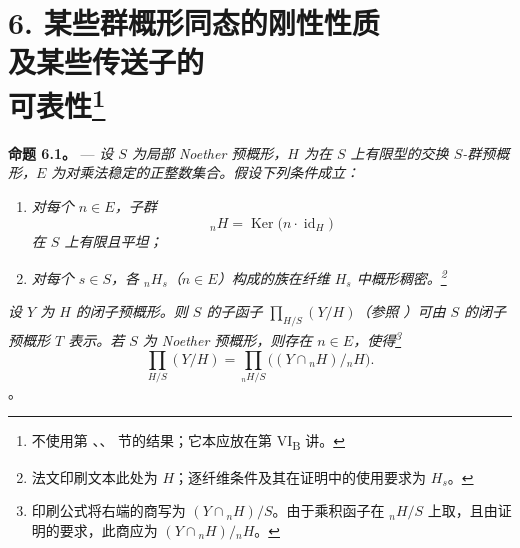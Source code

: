 
\section*{6. 某些群概形同态的刚性性质\\及某些传送子的\\可表性\footnote{ 不使用第 、、 节的结果；它本应放在第 VI\textsubscript{B} 讲。}}

\medskip\noindent{}\textbf{命题 6.1。} --- \textit{设 \(S\) 为局部 Noether 预概形，\(H\) 为在 \(S\) 上有限型的交换 \(S\)-群预概形，\(E\) 为对乘法稳定的正整数集合。假设下列条件成立：}

\begin{enumerate}\item[(a)]\textit{对每个 \(n\in E\)，子群}  \[
  {}_nH=\operatorname{Ker}\bigl(n\cdot\operatorname{id}_H\bigr)
\]\textit{在 \(S\) 上有限且平坦；}

\item[(b)]\textit{对每个 \(s\in S\)，各 \({}_nH_s\)（\(n\in E\)）构成的族在纤维 \(H_s\) 中概形稠密。\footnote{法文印刷文本此处为 \(H\)；逐纤维条件及其在证明中的使用要求为 \(H_s\)。}}\end{enumerate}

\textit{设 \(Y\) 为 \(H\) 的闭子预概形。则 \(S\) 的子函子 \(\prod_{H/S}(Y/H)\)（参照 ）可由 \(S\) 的闭子预概形 \(T\) 表示。若 \(S\) 为 Noether 预概形，则存在 \(n\in E\)，使得\footnote{印刷公式将右端的商写为 \((Y\cap{}_nH)/S\)。由于乘积函子在 \({}_nH/S\) 上取，且由证明的要求，此商应为 \((Y\cap{}_nH)/{}_nH\)。}}  \[
  \tag{x}
  \prod_{H/S}(Y/H)
  =
  \prod_{{}_nH/S}\bigl((Y\cap{}_nH)/{}_nH\bigr).
\]。

